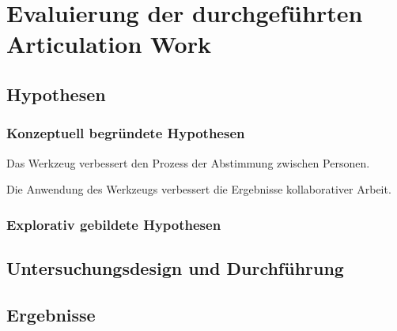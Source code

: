 \chapter{Evaluierung der durchgeführten Articulation Work} %
\label{cha:eval_aw}

\section{Hypothesen} %
\label{sec:a_hypothesen}

\subsection{Konzeptuell begründete Hypothesen} %
\label{sub:a_konzeptionell_begründete_hypothesen}

\begin{hyp}
	Das Werkzeug verbessert den Prozess der Abstimmung zwischen Personen.
\end{hyp}

\begin{hyp}
	Die Anwendung des Werkzeugs verbessert die Ergebnisse kollaborativer Arbeit.
\end{hyp}


\subsection{Explorativ gebildete Hypothesen} %
\label{sub:a_explorativ_gebildete_hypothesen}



\section{Untersuchungsdesign und Durchführung} %
\label{sec:a_untersuchungsdesign}


\section{Ergebnisse} %
\label{sec:a_ergebnisse}


